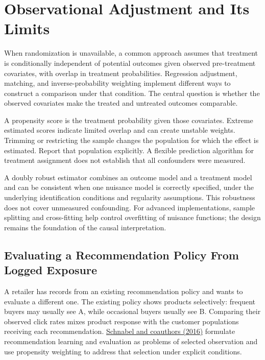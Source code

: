 \hypertarget{M06-observational-adjustment-and-its-limits}{%
\section{Observational Adjustment and Its
Limits}\label{M06-observational-adjustment-and-its-limits}}

\noindent When randomization is unavailable, a common approach assumes that
treatment is conditionally independent of potential outcomes given
observed pre-treatment covariates, with overlap in treatment
probabilities. Regression adjustment, matching, and inverse-probability
weighting implement different ways to construct a comparison under that
condition. The central question is whether the observed covariates make
the treated and untreated outcomes comparable.

A propensity score is the treatment probability given those covariates.
Extreme estimated scores indicate limited overlap and can create
unstable weights. Trimming or restricting the sample changes the
population for which the effect is estimated. Report that population
explicitly. A flexible prediction algorithm for treatment assignment
does not establish that all confounders were measured.

A doubly robust estimator combines an outcome model and a treatment
model and can be consistent when one nuisance model is correctly
specified, under the underlying identification conditions and regularity
assumptions. This robustness does not cover unmeasured confounding. For
advanced implementations, sample splitting and cross-fitting help
control overfitting of nuisance functions; the design remains the
foundation of the causal interpretation.

\hypertarget{M06-evaluating-a-recommendation-policy-from-logged-exposure}{%
\subsection{Evaluating a Recommendation Policy From Logged
Exposure}\label{M06-evaluating-a-recommendation-policy-from-logged-exposure}}

\noindent A retailer has records from an existing recommendation policy and wants
to evaluate a different one. The existing policy shows products
selectively: frequent buyers may usually see A, while occasional buyers
usually see B. Comparing their observed click rates mixes product
response with the customer populations receiving each recommendation.
\href{https://proceedings.mlr.press/v48/schnabel16.html}{Schnabel and
coauthors (2016)} formulate recommendation learning and evaluation as
problems of selected observation and use propensity weighting to address
that selection under explicit conditions.

